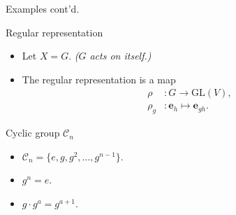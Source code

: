 \documentclass[handout, 10pt]{beamer}
\newcommand{\GL}{\text{GL}}
\newcommand{\Cyc}{\mathcal{C}}
\newcommand{\bas}{\mathbf{e}}
\begin{document}
	\begin{frame}{Examples cont'd.}
		\begin{block}{Regular representation}
			\begin{itemize}
				\item Let $X = G$. \textit{($G$ acts on itself.)}
				
				\item The regular representation is a map
				\begin{align*}
					\rho &: G \rightarrow \GL(V), \\
					\rho_g &: \bas_h \mapsto \bas_{gh}.
				\end{align*}
			\end{itemize}
		\end{block}
		\begin{block}{Cyclic group $\Cyc_n$}
			\begin{itemize}
				\item $\Cyc_n = \{ e, g, g^2, \dots, g^{n-1}\}$.
				
				\item $g^n = e$.
				
				\item $g \cdot g^a = g^{a+1}$.
			\end{itemize}
		\end{block}
	\end{frame}
	
\end{document}
